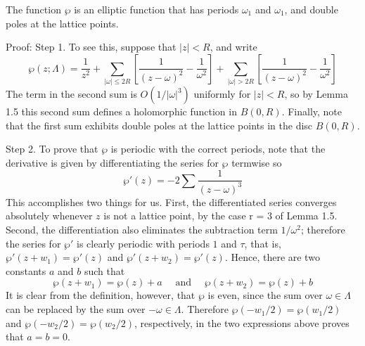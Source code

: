 \documentclass[12pt, oneside]{book}
\begin{document}
\begin{theorem}
    The function $\wp$ is an elliptic function that has periods $\omega_1$ and $\omega_1$, and double poles at the lattice points.

    Proof:
    Step 1. To see this, suppose that $\left|z\right|<R$, and write
    \begin{equation*}
        \wp(z;\Lambda)
        =
        \frac{1}{z^2}
        +
        \sum_{|\omega|\leq2R}\left[\frac{1}{(z-\omega)^2}-\frac{1}{\omega^2}\right]+\sum_{|\omega|>2R}\left[\frac{1}{(z-\omega)^2}-\frac{1}{\omega^2}\right]
    \end{equation*}
    The term in the second sum is $O(1/\left|\omega\right|^3)$ uniformly for $\left|z\right|< R$, so by Lemma 1.5 this second sum defines a holomorphic function in $B(0,R)$.
    Finally, note that the first sum exhibits double poles at the lattice points in the disc $B(0,R)$.

    Step 2. To prove that $\wp$ is periodic with the correct
    periods, note that the derivative is given by differentiating the
    series for $\wp$ termwise so
    $$
        \wp'(z)=-2\sum \frac{1}{(z-\omega)^3}
    $$
    This accomplishes two things for us. First, the differentiated series converges absolutely whenever $z$ is not a lattice point, by the case r = 3 of Lemma 1.5.
    Second, the differentiation also eliminates the subtraction term $1/\omega^2$; therefore the series for $\wp'$ is clearly periodic with periods $1$
    and $\tau$, that is, $\wp'(z+w_1)=\wp'(z)$ and $\wp'(z+w_2)=\wp'(z)$.
    Hence, there are two constants $a$ and $b$ such that
    \begin{equation*}
        \wp(z+w_1)=\wp(z)+a
        \quad\text{ and }\quad
        \wp(z+w_2)=\wp(z)+b
    \end{equation*}
    It is clear from the definition, however, that $\wp$ is even, since the sum over $\omega\in\Lambda$ can be replaced by the sum over $-\omega\in\Lambda$.
    Therefore $\wp(-w_1/2)=\wp(w_1/2)$ and $\wp(-w_2/2)=\wp(w_2/2)$, respectively, in the two expressions above proves that $a = b = 0$.
\end{theorem}

\subsection{}
\end{document}
